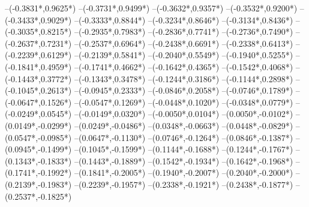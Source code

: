 {	--({-0.3831*\xskala},{0.9625*\yskala})
	--({-0.3731*\xskala},{0.9499*\yskala})
	--({-0.3632*\xskala},{0.9357*\yskala})
	--({-0.3532*\xskala},{0.9200*\yskala})
	--({-0.3433*\xskala},{0.9029*\yskala})
	--({-0.3333*\xskala},{0.8844*\yskala})
	--({-0.3234*\xskala},{0.8646*\yskala})
	--({-0.3134*\xskala},{0.8436*\yskala})
	--({-0.3035*\xskala},{0.8215*\yskala})
	--({-0.2935*\xskala},{0.7983*\yskala})
	--({-0.2836*\xskala},{0.7741*\yskala})
	--({-0.2736*\xskala},{0.7490*\yskala})
	--({-0.2637*\xskala},{0.7231*\yskala})
	--({-0.2537*\xskala},{0.6964*\yskala})
	--({-0.2438*\xskala},{0.6691*\yskala})
	--({-0.2338*\xskala},{0.6413*\yskala})
	--({-0.2239*\xskala},{0.6129*\yskala})
	--({-0.2139*\xskala},{0.5841*\yskala})
	--({-0.2040*\xskala},{0.5549*\yskala})
	--({-0.1940*\xskala},{0.5255*\yskala})
	--({-0.1841*\xskala},{0.4959*\yskala})
	--({-0.1741*\xskala},{0.4662*\yskala})
	--({-0.1642*\xskala},{0.4365*\yskala})
	--({-0.1542*\xskala},{0.4068*\yskala})
	--({-0.1443*\xskala},{0.3772*\yskala})
	--({-0.1343*\xskala},{0.3478*\yskala})
	--({-0.1244*\xskala},{0.3186*\yskala})
	--({-0.1144*\xskala},{0.2898*\yskala})
	--({-0.1045*\xskala},{0.2613*\yskala})
	--({-0.0945*\xskala},{0.2333*\yskala})
	--({-0.0846*\xskala},{0.2058*\yskala})
	--({-0.0746*\xskala},{0.1789*\yskala})
	--({-0.0647*\xskala},{0.1526*\yskala})
	--({-0.0547*\xskala},{0.1269*\yskala})
	--({-0.0448*\xskala},{0.1020*\yskala})
	--({-0.0348*\xskala},{0.0779*\yskala})
	--({-0.0249*\xskala},{0.0545*\yskala})
	--({-0.0149*\xskala},{0.0320*\yskala})
	--({-0.0050*\xskala},{0.0104*\yskala})
	--({0.0050*\xskala},{-0.0102*\yskala})
	--({0.0149*\xskala},{-0.0299*\yskala})
	--({0.0249*\xskala},{-0.0486*\yskala})
	--({0.0348*\xskala},{-0.0663*\yskala})
	--({0.0448*\xskala},{-0.0829*\yskala})
	--({0.0547*\xskala},{-0.0985*\yskala})
	--({0.0647*\xskala},{-0.1130*\yskala})
	--({0.0746*\xskala},{-0.1264*\yskala})
	--({0.0846*\xskala},{-0.1387*\yskala})
	--({0.0945*\xskala},{-0.1499*\yskala})
	--({0.1045*\xskala},{-0.1599*\yskala})
	--({0.1144*\xskala},{-0.1688*\yskala})
	--({0.1244*\xskala},{-0.1767*\yskala})
	--({0.1343*\xskala},{-0.1833*\yskala})
	--({0.1443*\xskala},{-0.1889*\yskala})
	--({0.1542*\xskala},{-0.1934*\yskala})
	--({0.1642*\xskala},{-0.1968*\yskala})
	--({0.1741*\xskala},{-0.1992*\yskala})
	--({0.1841*\xskala},{-0.2005*\yskala})
	--({0.1940*\xskala},{-0.2007*\yskala})
	--({0.2040*\xskala},{-0.2000*\yskala})
	--({0.2139*\xskala},{-0.1983*\yskala})
	--({0.2239*\xskala},{-0.1957*\yskala})
	--({0.2338*\xskala},{-0.1921*\yskala})
	--({0.2438*\xskala},{-0.1877*\yskala})
	--({0.2537*\xskala},{-0.1825*\yskala})
}
